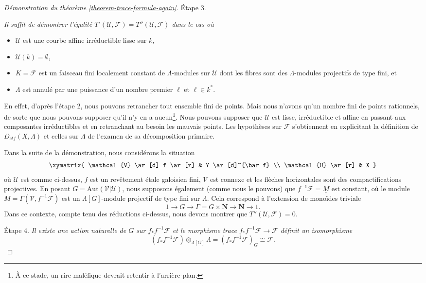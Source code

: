 \begin{proof}[Démonstration du théorème \ref{theorem-trace-formula-again}]
\medskip\noindent
Étape 3. {\it Il suffit de démontrer l'égalité
$T'(\mathcal{U}, \mathcal{F}) = T''(\mathcal{U}, \mathcal{F})$
dans le cas où
\begin{itemize}
\item $\mathcal{U}$ est une courbe affine irréductible lisse sur $k$,
\item $\mathcal{U}(k) = \emptyset$,
\item $K=\mathcal{F}$ est un faisceau fini localement constant de $\Lambda$-modules
sur $\mathcal{U}$ dont les fibres sont des $\Lambda$-modules projectifs de type fini, et
\item $\Lambda$ est annulé par une puissance d'un nombre premier $\ell$ et $\ell \in k^*$.
\end{itemize}
}

\medskip\noindent
En effet, d'après l'étape 2, nous pouvons retrancher tout ensemble fini de points. Mais nous
n'avons qu'un nombre fini de points rationnels, de sorte que nous pouvons supposer qu'il n'y en a
aucun\footnote{À ce stade, un rire maléfique devrait retentir à l'arrière-plan.}.
Nous pouvons supposer que $\mathcal{U}$ est lisse, irréductible et affine en passant aux
composantes irréductibles et en retranchant au besoin les mauvais points. Les
hypothèses sur $\mathcal{F}$ s'obtiennent en explicitant la définition de
$D_{ctf}(X, \Lambda)$ et celles sur $\Lambda$ de l'examen de sa décomposition
primaire.

\medskip\noindent
Dans la suite de la démonstration, nous considérons la situation
$$
\xymatrix{
\mathcal{V} \ar[d]_f \ar[r] & Y \ar[d]^{\bar f} \\
\mathcal{U} \ar[r] & X
}
$$
où $\mathcal{U}$ est comme ci-dessus, $f$ est un revêtement \'etale galoisien fini,
$\mathcal{V}$ est connexe et les flèches horizontales sont des
compactifications projectives. En posant $G=\text{Aut}(\mathcal{V}|\mathcal{U})$, nous supposons également
(comme nous le pouvons) que $f^{-1}\mathcal{F} =\underline M$ est constant, où le
module $M = \Gamma(\mathcal{V}, f^{-1}\mathcal{F})$ est un $\Lambda[G]$-module
projectif de type fini sur $\Lambda$. Cela correspond à l'extension de
monoïdes triviale
$$
1\to G\to \Gamma = G \times \mathbf{N}\to \mathbf{N}\to 1.
$$
Dans ce contexte, compte tenu des réductions ci-dessus, nous devons montrer que
$T''(\mathcal{U}, \mathcal{F}) = 0$.

\medskip\noindent
Étape 4. {\it Il existe une action naturelle de $G$ sur $f_*f^{-1}\mathcal{F}$ et
le morphisme trace $f_*f^{-1}\mathcal{F}\to \mathcal{F}$ définit un isomorphisme}
$$
(f_*f^{-1}\mathcal{F})\otimes_{\Lambda[G]} \Lambda =
(f_*f^{-1}\mathcal{F})_G \cong \mathcal{F}.
$$


\end{proof}
